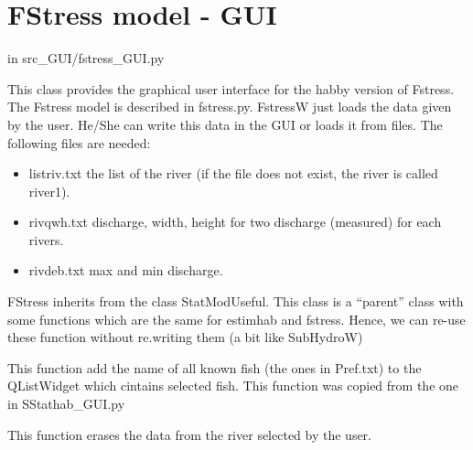 \documentclass[letterpaper,10pt,english]{sphinxmanual}
\begin{document}
\section{FStress model - GUI}
\label{\detokenize{index:fstress-model-gui}}
in src\_GUI/fstress\_GUI.py
\label{\detokenize{index:module-src_GUI.fstress_GUI}}

\begin{fulllineitems}
\label{\detokenize{index:src_GUI.fstress_GUI.FstressW}}
This class provides the graphical user interface for the habby version of Fstress. The Fstress model is described in
fstress.py. FstressW just loads the data given by the user. He/She can write this data in the GUI or loads it
from files. The following files are needed:
\begin{itemize}
\item {} 
listriv.txt the list of the river (if the file does not exist, the river is called river1).

\item {} 
rivqwh.txt discharge, width, height for two discharge (measured) for each rivers.

\item {} 
rivdeb.txt max and min discharge.

\end{itemize}

FStress inherits from the class StatModUseful. This class is a ``parent'' class with some functions which are the same
for estimhab and fstress. Hence, we can re-use these function without re.writing them (a bit like SubHydroW)

\begin{fulllineitems}
\label{\detokenize{index:src_GUI.fstress_GUI.FstressW.add_all_fish}}
This function add the name of all known fish (the ones in Pref.txt) to the QListWidget which cintains selected
fish. This function was copied from the one in SStathab\_GUI.py

\end{fulllineitems}


\begin{fulllineitems}
\label{\detokenize{index:src_GUI.fstress_GUI.FstressW.erase_name}}
This function erases the data from the river selected by the user.


\end{fulllineitems}
\end{fulllineitems}
\end{document}
